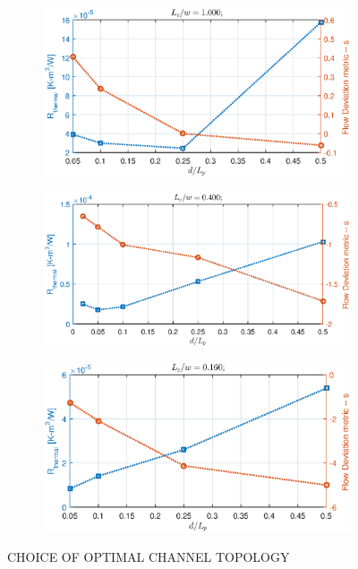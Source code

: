 \documentclass[twocolumn,10pt,cleanfoot]{ihmtc}
\begin{document}
\begin{figure}
\centering
   \begin{subfigure}[b]{0.55\textwidth}
   \includegraphics[width=0.85\linewidth]{optgeo_a.eps}
   \caption{}
   \label{optgeo_a} 
\end{subfigure}
%
   \begin{subfigure}[b]{0.55\textwidth}
   \includegraphics[width=0.85\linewidth]{optgeo_b.eps}
   \caption{}
   \label{optgeo_b} 
\end{subfigure}
%
%
   \begin{subfigure}[b]{0.55\textwidth}
   \includegraphics[width=0.85\linewidth]{optgeo_c.eps}
   \caption{}
   \label{optgeo_c} 
\end{subfigure}
%
\caption{CHOICE OF OPTIMAL CHANNEL TOPOLOGY}
\vspace{-3em}
\end{figure}
%
%
\end{document}
